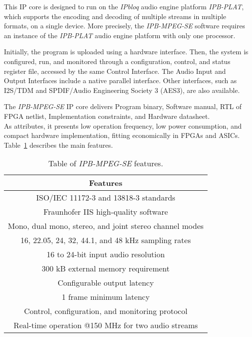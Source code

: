 This IP core is designed to run on the \textit{IPbloq} audio engine platform \textit{IPB-PLAT}, which supports the encoding and decoding of multiple streams in multiple formats, on a single device. More precisely, the \textit{IPB-MPEG-SE} software requires an instance of the \textit{IPB-PLAT} audio engine platform with only one processor. 

Initially, the program is uploaded using a hardware interface. Then, the system is configured, run, and monitored through a configuration, control, and status register file, accessed by the same Control Interface.
The Audio Input and Output Interfaces include a native parallel interface. Other interfaces, such as I2S/TDM and SPDIF/Audio Engineering Society 3 (AES3), are also available.

The \textit{IPB-MPEG-SE} IP core delivers Program binary, Software manual, RTL of FPGA netlist, Implementation constraints, and Hardware datasheet.\\
As attributes, it presents low operation frequency, low power consumption, and compact hardware implementation, fitting economically in FPGAs and ASICs.
Table~\ref{tab:ipbloq} describes the main features.

\vspace{0.5cm}

\begin{table}[h]
    \centering
    \begin{tabular}{|c|}
        \hline
        \textbf{Features} \\
        \hline
         ISO/IEC 11172-3 and 13818-3 standards\\
         \hline
         Fraunhofer IIS high-quality software \\
         \hline
         Mono, dual mono, stereo, and joint stereo channel modes\\
         \hline
         16, 22.05, 24, 32, 44.1, and 48 kHz sampling rates \\
         \hline
         16 to 24-bit input audio resolution \\
         \hline
         300 kB external memory requirement\\
         \hline
         Configurable output latency \\
         \hline
         1 frame minimum latency\\
         \hline
         Control, configuration, and monitoring protocol\\
         \hline
         Real-time operation @150 MHz for two audio streams\\
         \hline
    \end{tabular}
    \caption{Table of \textit{IPB-MPEG-SE} features.}
    \label{tab:ipbloq}
\end{table}

